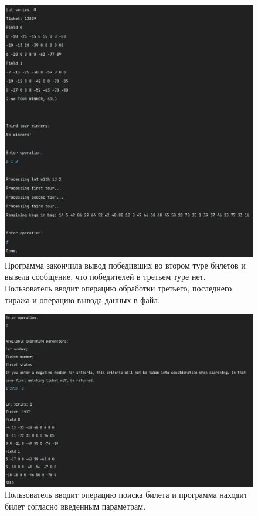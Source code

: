\documentclass[a4paper,14pt]{article}
\begin{document}
\begin{figure}
  \centering
  \captionsetup{justification=centering,margin=1cm}
  \includegraphics[width=\linewidth]{pictures/5}
  \caption{Программа закончила вывод победивших во втором туре билетов и вывела сообщение, что победителей в третьем туре нет. Пользователь вводит операцию обработки третьего, последнего тиража и операцию вывода данных в файл.}
\end{figure}
\begin{figure}[H]
  \centering
  \captionsetup{justification=centering,margin=1cm}
  \includegraphics[width=\linewidth]{pictures/10}
  \caption{Пользователь вводит операцию поиска билета и программа находит билет согласно введенным параметрам.}
\end{figure}
\end{document}
